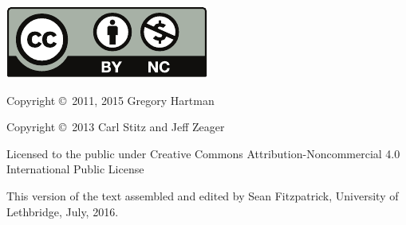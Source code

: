 \noindent\hskip -1in\begin{minipage}{2in}
\includegraphics{text/by-nc} 
\end{minipage}
\begin{minipage}{3in}
\noindent Copyright \copyright\ 2011, 2015 Gregory Hartman

\noindent Copyright \copyright\ 2013 Carl Stitz and Jeff Zeager

Licensed to the public under Creative Commons Attribution-Noncommercial 4.0 International Public License
\end{minipage}

\bigskip

\bigskip



\bigskip

This version of the text assembled and edited by Sean Fitzpatrick, University of Lethbridge, July, 2016. 
